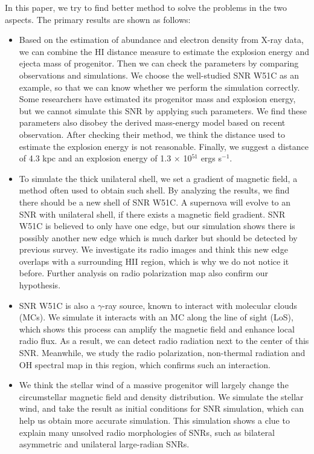 In this paper, we try to find better method to solve the problems in the two aspects. The primary
results are shown as follows:
\begin{itemize}
   \item Based on the estimation of abundance and electron density from X-ray data, we can combine
   the HI distance measure to estimate the explosion energy and ejecta mass of progenitor.
   Then we can check the parameters by comparing observations and simulations.
   We choose the well-studied SNR W51C as an example, so that we can know whether we perform the
   simulation correctly.
   Some researchers have estimated its progenitor mass and explosion energy, but we cannot
   simulate this SNR by applying such parameters.
   We find these parameters also disobey the derived mass-energy model based on recent observation.
   After checking their method, we think the distance used to estimate the explosion energy is not
   reasonable.
   Finally, we suggest a distance of 4.3 kpc and an explosion energy of 1.3 $\times$ 10$^{51}$ ergs
   s$^{-1}$.

   \item To simulate the thick unilateral shell, we set a gradient of magnetic field, a method
   often used to obtain such shell.
   By analyzing the results, we find there should be a new shell of SNR W51C.
   A supernova will evolve to an SNR with unilateral shell, if there exists a magnetic field
   gradient.
   SNR W51C is believed to only have one edge, but our simulation shows there is possibly
   another new edge which is much darker but should be detected by previous survey.
   We investigate its radio images and think this new edge overlaps with a surrounding HII
   region, which is why we do not notice it before.
   Further analysis on radio polarization map also confirm our hypothesis.

   \item SNR W51C is also a $\gamma$-ray source, known to interact with molecular clouds (MCs).
   We simulate it interacts with an MC along the line of sight (LoS), which shows this process
   can amplify the magnetic field and enhance local radio flux.
   As a result, we can detect radio radiation next to the center of this SNR.
   Meanwhile, we study the radio polarization, non-thermal radiation and OH spectral map in this
   region, which confirms such an interaction.

   \item We think the stellar wind of a massive progenitor will largely change the circumstellar
   magnetic field and density distribution.
   We simulate the stellar wind, and take the result as initial conditions for SNR simulation,
   which can help us obtain more accurate simulation.
   This simulation shows a clue to explain many unsolved radio morphologies of SNRs, such as
   bilateral asymmetric and unilateral large-radian SNRs.



\end{itemize}
